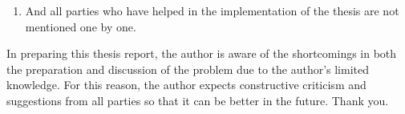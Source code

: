 \begin{thankyou}
\begin{enumerate}
    \item And all parties who have helped in the implementation of the thesis are not mentioned one by one.
\end{enumerate} 

In preparing this thesis report, the author is aware of the shortcomings in both the preparation and discussion of the problem due to the author's limited knowledge. For this reason, the author expects constructive criticism and suggestions from all parties so that it can be better in the future. Thank you.




\end{thankyou}
